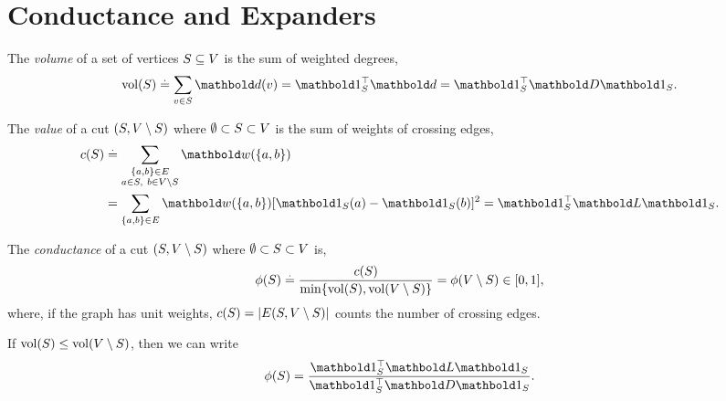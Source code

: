 
\chapter{Conductance and Expanders}

\begin{defn}[Volume] The \emph{volume} of a set of vertices $S \subseteq V$ is the sum of weighted degrees, \begin{align}
    \vol(S) \defeq \sum_{v \in \sS} \vd(v) = \trans{\vOne_\sS}\vd = \trans{\vOne_\sS}\mD\vOne_\sS.
\end{align}
\end{defn}

\begin{defn} The \emph{value} of a cut $(S, V \setminus S)$ where $\emptyset \subset S \subset V$ is the sum of weights of crossing edges, \begin{align}\begin{split}
    c(\sS) &\defeq \sum_{\substack{\{a,b\} \in \sE \\ a \in \sS,\ b \in \sV \setminus \sS}} \vw(\{a,b\}) \\
    &= \sum_{\{a,b\}\in\sE} \vw(\{a,b\}) [\vOne_\sS(a) - \vOne_\sS(b)]^2 = \trans{\vOne_\sS}\mL\vOne_\sS.
\end{split}\end{align}
\end{defn}

\begin{defn} The \emph{conductance} of a cut $(S, V \setminus S)$ where $\emptyset \subset S \subset V$ is, \begin{align}
    \phi(S) \overset{.}{=} \frac{c(S)}{\min\{\mathrm{vol}(S), \mathrm{vol}(V \setminus S)\}} = \phi(V \setminus S) \in [0,1],
\end{align} where, if the graph has unit weights, $c(S) = |E(S, V \setminus S)|$ counts the number of crossing edges.
\end{defn}

\begin{rmk}
If $\mathrm{vol}(S) \leq \mathrm{vol}(V \setminus S)$, then we can write \begin{align}
    \phi(\sS) = \frac{\trans{\vOne_\sS}\mL\vOne_\sS}{\trans{\vOne_\sS}\mD\vOne_\sS}.
\end{align}
\end{rmk}

